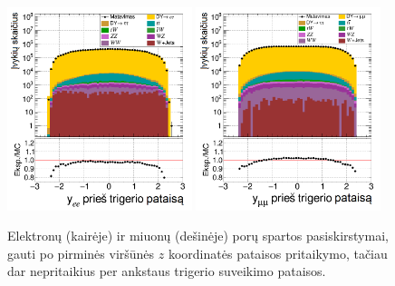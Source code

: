 \documentclass[a4paper, 12pt, oneside]{article}
\begin{document}
\begin{figure}[H]
	\includegraphics[width=0.48\textwidth]{ee_rapi_beforeL1.png}
	\includegraphics[width=0.48\textwidth]{mumu_rapi_beforeL1.png}
	\caption{\label{fig:rapibL1} Elektronų (kairėje) ir miuonų (dešinėje) porų spartos pasiskirstymai,
		gauti po pirminės viršūnės $z$ koordinatės pataisos pritaikymo, tačiau dar nepritaikius per ankstaus
		trigerio suveikimo pataisos.}
\end{figure}
\end{document}

